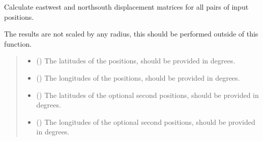 \documentclass[letterpaper,10pt,english]{sphinxmanual}
\begin{document}

\begin{fulllineitems}
\label{\detokenize{misc:glomar_gridding.distances.displacements}}
\pysigstartsignatures
\pysiglinewithargsret
{}
{\sphinxparamcomma {}\sphinxparamcomma {}\sphinxparamcomma {}\sphinxparamcomma {}}
{}
\pysigstopsignatures
\sphinxAtStartPar
Calculate east\sphinxhyphen{}west and north\sphinxhyphen{}south displacement matrices for all pairs
of input positions.

\sphinxAtStartPar
The results are not scaled by any radius, this should be performed outside
of this function.
\begin{quote}\begin{description}
\begin{itemize}
\item {}
\sphinxAtStartPar
{} () \textendash{} The latitudes of the positions, should be provided in degrees.

\item {}
\sphinxAtStartPar
{} () \textendash{} The longitudes of the positions, should be provided in degrees.

\item {}
\sphinxAtStartPar
{} () \textendash{} The latitudes of the optional second positions, should be provided in
degrees.

\item {}
\sphinxAtStartPar
{} () \textendash{} The longitudes of the optional second positions, should be provided in
degrees.


\end{itemize}
\end{description}
\end{quote}
\end{fulllineitems}
\end{document}

